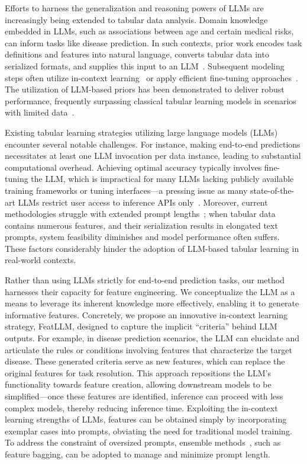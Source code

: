 Efforts to harness the generalization and reasoning powers of LLMs are increasingly being extended to tabular data analysis. Domain knowledge embedded in LLMs, such as associations between age and certain medical risks, can inform tasks like disease prediction. In such contexts, prior work encodes task definitions and features into natural language, converts tabular data into serialized formats, and supplies this input to an LLM~\cite{dinh2022lift,wang2023anypredict}. Subsequent modeling steps often utilize in-context learning~\cite{nam2023semi} or apply efficient fine-tuning approaches~\cite{dinh2022lift,hegselmann2023tabllm}. The utilization of LLM-based priors has been demonstrated to deliver robust performance, frequently surpassing classical tabular learning models in scenarios with limited data~\cite{hegselmann2023tabllm}.

Existing tabular learning strategies utilizing large language models (LLMs) encounter several notable challenges. For instance, making end-to-end predictions necessitates at least one LLM invocation per data instance, leading to substantial computational overhead. Achieving optimal accuracy typically involves fine-tuning the LLM, which is impractical for many LLMs lacking publicly available training frameworks or tuning interfaces—a pressing issue as many state-of-the-art LLMs restrict user access to inference APIs only~\cite{anil2023palm,openai2023gpt4}. Moreover, current methodologies struggle with extended prompt lengths~\cite{liu2023lost}; when tabular data contains numerous features, and their serialization results in elongated text prompts, system feasibility diminishes and model performance often suffers. These factors considerably hinder the adoption of LLM-based tabular learning in real-world contexts.

Rather than using LLMs strictly for end-to-end prediction tasks, our method harnesses their capacity for feature engineering. We conceptualize the LLM as a means to leverage its inherent knowledge more effectively, enabling it to generate informative features. Concretely, we propose an innovative in-context learning strategy, \textsf{FeatLLM}, designed to capture the implicit “criteria” behind LLM outputs. For example, in disease prediction scenarios, the LLM can elucidate and articulate the rules or conditions involving features that characterize the target disease. These generated criteria serve as new features, which can replace the original features for task resolution. This approach repositions the LLM's functionality towards feature creation, allowing downstream models to be simplified—once these features are identified, inference can proceed with less complex models, thereby reducing inference time. Exploiting the in-context learning strengths of LLMs, features can be obtained simply by incorporating exemplar cases into prompts, obviating the need for traditional model training. To address the constraint of oversized prompts, ensemble methods~\cite{breiman2001random}, such as feature bagging, can be adopted to manage and minimize prompt length.

